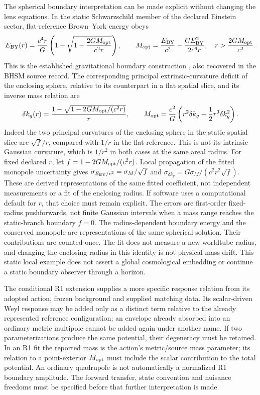 The spherical boundary interpretation can be made explicit without
changing the lens equations. In the static Schwarzschild member of the
declared Einstein sector, flat-reference Brown--York energy obeys
\begin{equation}
 E_{\rm BY}(r)=\frac{c^4r}{G}
       \left(1-\sqrt{1-\frac{2GM_{\rm opt}}{c^2r}}\right),\qquad
 M_{\rm opt}=\frac{E_{\rm BY}}{c^2}
       -\frac{G E_{\rm BY}^2}{2c^6r},\quad
 r>\frac{2GM_{\rm opt}}{c^2}.
 \label{eq:bhsm-boundary-mass-interpretation}
\end{equation}
This is the established gravitational boundary construction
\cite{BrownYork1993}, also recovered in the BHSM source record.
The corresponding principal extrinsic-curvature deficit of the enclosing
sphere, relative to its counterpart in a flat spatial slice, and its
inverse mass relation are
\begin{equation}
 \delta k_g(r)=\frac{1-\sqrt{1-2GM_{\rm opt}/(c^2r)}}r,\qquad
 M_{\rm opt}=\frac{c^2}{G}
       \left(r^2\delta k_g-\frac12r^3\delta k_g^2\right).
 \label{eq:bhsm-curvature-mass-interpretation}
\end{equation}
Indeed the two principal curvatures of the enclosing sphere in the static
spatial slice are $\sqrt f/r$, compared with $1/r$ in the flat reference.
This is not its intrinsic Gaussian curvature, which is $1/r^2$ in both
cases at the same areal radius.
For fixed declared $r$, let $f=1-2GM_{\rm opt}/(c^2r)$. Local propagation
of the fitted monopole uncertainty gives
$\sigma_{E_{\rm BY}/c^2}=\sigma_M/\sqrt f$ and
$\sigma_{\delta k_g}=G\sigma_M/(c^2r^2\sqrt f)$.
These are derived representations of the same fitted coefficient, not
independent measurements or a fit of the enclosing radius. If software
uses a computational default for $r$, that choice must remain explicit.
The errors are first-order fixed-radius pushforwards, not finite Gaussian
intervals when a mass range reaches the static-branch boundary $f=0$.
The radius-dependent boundary energy and the conserved monopole are
representations of the same spherical solution. Their contributions
are counted once. The fit does not measure a new worldtube radius, and
changing the enclosing radius in this identity is not physical mass drift.
This static local example does not assert a global cosmological embedding
or continue a static boundary observer through a horizon.

The conditional R1 extension supplies a more specific response relation
from its adopted action, frozen background and supplied matching data.
Its scalar-driven Weyl response may be added only as a distinct term
relative to the already represented reference configuration; an envelope
already absorbed into an ordinary metric multipole cannot be added again
under another name. If two parameterizations produce the same potential,
their degeneracy must be retained. In an R1 fit the reported mass is the
action's metric/source mass parameter; its relation to a point-exterior
$M_{\rm opt}$ must include the scalar contribution to the total potential.
An ordinary quadrupole is not automatically a normalized R1 boundary
amplitude. The forward transfer, state convention and nuisance freedoms
must be specified before that further interpretation is made.

